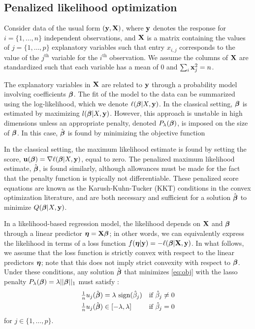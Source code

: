 \subsection{Penalized likelihood optimization}

Consider data of the usual form $(\mathbf{y}, \mathbf{X})$, where $\mathbf{y}$ denotes the response for $i = \{1, \ldots, n\}$ independent observations, and $\mathbf{X}$ is a matrix containing the values of $j = \{1, \ldots, p\}$ explanatory variables such that entry $x_{i,j}$ corresponds to the value of the $j^{\textrm{th}}$ variable for the $i^{\textrm{th}}$ observation.  We assume the columns of $\mathbf{X}$ are standardized such that each variable has a mean of $0$ and $\sum_i \mathbf{x}_j^2 = n$.

The explanatory variables in $\mathbf{X}$ are related to $\mathbf{y}$ through a probability model involving coefficients $\boldsymbol{\beta}$.  The fit of the model to the data can be summarized using the log-likelihood, which we denote $\ell(\boldsymbol{\beta}|X,\mathbf{y})$.  In the classical setting, $\boldsymbol{\beta}$ is estimated by maximizing $l(\boldsymbol{\beta}|X,\mathbf{y})$.  However, this approach is unstable in high dimensions unless an appropriate penalty, denoted $P_{\lambda}(\boldsymbol{\beta})$, is imposed on the size of $\boldsymbol{\beta}$.
In this case, $\hat{\boldsymbol{\beta}}$ is found by minimizing the objective function

In the classical setting, the maximum likelihood estimate is found by setting the score, $\mathbf{u}(\boldsymbol{\beta}) = \nabla \ell(\boldsymbol{\beta}|X,\mathbf{y})$, equal to zero.  The penalized maximum likelihood estimate, $\hat{\boldsymbol{\beta}}$, is found similarly, although allowances must be made for the fact that the penalty function is typically not differentiable.  These penalized score equations are known as the Karush-Kuhn-Tucker (KKT) conditions in the convex optimization literature, and are both necessary and sufficient for a solution $\hat{\boldsymbol{\beta}}$ to minimize $Q(\boldsymbol{\beta}|X,\mathbf{y})$.

In a likelihood-based regression model, the likelihood depends on $\mathbf{X}$ and $\boldsymbol{\beta}$ through a linear predictor $\boldsymbol{\eta} = \mathbf{X}\boldsymbol{\beta}$; in other words, we can equivalently express the likelihood in terms of a loss function $f(\boldsymbol{\eta}|\mathbf{y})=-\ell(\boldsymbol{\beta}|\mathbf{X},\mathbf{y})$.
In what follows, we assume that the loss function is strictly convex with respect to the linear predictors $\boldsymbol{\eta}$; note that this does not imply strict convexity with respect to $\boldsymbol{\beta}$.
Under these conditions, any solution $\hat{\boldsymbol{\beta}}$ that minimizes \eqref{eq:obj} with the lasso penalty $P_{\lambda} (\boldsymbol{\beta}) = \lambda||\boldsymbol{\beta}||_1$ must satisfy \citep{lasso_kkt}:
\begin{equation}
  \label{eq:kkt}
  \begin{alignedat}{2}
  \tfrac{1}{n}u_j(\hat{\boldsymbol{\beta}}) &= \lambda \textrm{ sign}(\hat{\beta}_j) &\quad \text{if } \hat{\beta}_j &\neq 0 \\
  \tfrac{1}{n}u_j(\hat{\boldsymbol{\beta}}) &\in [-\lambda,\lambda]  &\quad \text{if }  \hat{\beta}_j &= 0
  \end{alignedat}
\end{equation}
for $j \in \{1, \ldots, p\}$.

